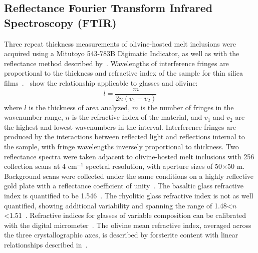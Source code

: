 \documentclass[draft]{agujournal2019}
\begin{document}
\subsection{Reflectance Fourier Transform Infrared Spectroscopy (FTIR)}
Three repeat thickness measurements of olivine-hosted melt inclusions were acquired using a Mitutoyo 543-783B Digimatic Indicator, as well as with the reflectance method described by~. Wavelengths of interference fringes are proportional to the thickness and refractive index of the sample for thin silica films~\cite{Nishikidaetal1996, Tamicetal2001, WysoczanskiandTani2006, Sunetal2007}.~ show the relationship applicable to glasses and olivine: 
\begin{equation}
l = \frac{m}{2n (v_1 - v_2)}
\end{equation}
where $l$ is the thickness of area analyzed, $m$ is the number of fringes in the wavenumber range, $n$ is the refractive index of the material, and $v_1$ and $v_2$ are the highest and lowest wavenumbers in the interval. Interference fringes are produced by the interactions between reflected light and reflections internal to the sample, with fringe wavelengths inversely proportional to thickness. Two reflectance spectra were taken adjacent to olivine-hosted melt inclusions with 256 collection scans at 4 cm$^{-1}$ spectral resolution, with aperture sizes of 50$\times$50 \textmu m. Background scans were collected under the same conditions on a highly reflective gold plate with a reflectance coefficient of unity~\cite{NicholsandWysoczanski2007}. The basaltic glass refractive index is quantified to be 1.546~\cite{KumagaiandKaneoka2003}. The rhyolitic glass refractive index is not as well quantified, showing additional variability and spanning the range of 1.48\textless $n$\textless 1.51~\cite{Trogeretal1959, Tamicetal2001}. Refractive indices for glasses of variable composition can be calibrated with the digital micrometer~\cite{DuncanandDasgupta2015, Tamicetal2001}. The olivine mean refractive index, averaged across the three crystallographic axes, is described by forsterite content with linear relationships described in~. 
\end{document}
